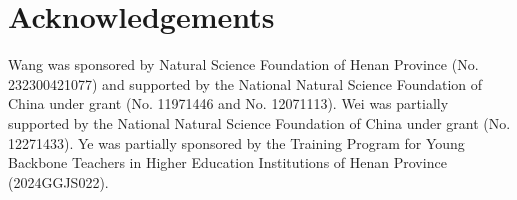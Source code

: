 \documentclass[11pt]{article}
\theoremstyle{plain}\newtheorem{definition}{Definition}[section]
\theoremstyle{definition}\newtheorem{theorem}{Theorem}[section]
\theoremstyle{plain}\newtheorem{lemma}[theorem]{Lemma}
\theoremstyle{plain}\newtheorem{coro}[theorem]{Corollary}
\theoremstyle{plain}\newtheorem{prop}[theorem]{Proposition}
\theoremstyle{remark}\newtheorem{remark}{Remark}[section]
\numberwithin{equation}{section}
\begin{document}
\section*{Acknowledgements}
 Wang was sponsored by Natural Science Foundation of
Henan Province (No. 232300421077)  and supported by  the National Natural
Science Foundation of China under grant (No. 11971446 and No. 12071113). Wei was partially supported by the National Natural Science Foundation of China under grant (No. 12271433).
 Ye was
partially sponsored by the Training Program for Young Backbone Teachers in
Higher Education Institutions of Henan Province (2024GGJS022).




\end{document}
